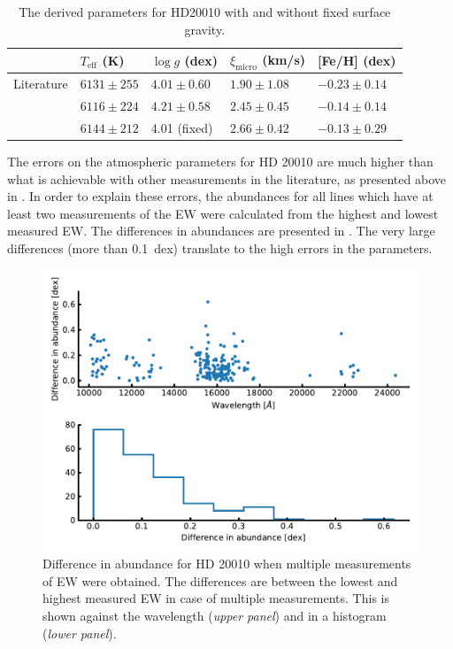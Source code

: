 \begin{table}[htb!]
    \caption{The derived parameters for HD20010 with and without fixed surface gravity.}
    \label{tab:HD20010_results}
    \centering
    \begin{tabular}{lllll}
      \hline\hline
                     & $T_\mathrm{eff}$ (K) &  $\log g$ (dex)  &   $\xi_\mathrm{micro}$ (km/s)  & [Fe/H] (dex)      \\
      \hline
        Literature   & $6131 \pm 255$       &  $4.01 \pm 0.60$ &    $1.90 \pm 1.08$              & $-0.23 \pm 0.14$ \\
      \hline
                     & $6116 \pm 224$       &  $4.21 \pm 0.58$ &    $2.45 \pm 0.45$              & $-0.14 \pm 0.14$ \\
                     & $6144 \pm 212$       &   4.01 (fixed)   &    $2.66 \pm 0.42$              & $-0.13 \pm 0.29$ \\
      \hline
    \end{tabular}
\end{table}

The errors on the atmospheric parameters for HD 20010 are much higher than what is achievable with
other measurements in the literature, as presented above in . In order to explain
these errors, the abundances for all lines which have at least two measurements of the EW were
calculated from the highest and lowest measured EW. The differences in abundances are presented in
. The very large differences (more than \SI{0.1}{dex}) translate to the
high errors in the parameters.

\begin{figure}[htpb!]
    \centering
    \includegraphics[width=0.8\linewidth]{figures/HD20010abundance_error.pdf}
    \caption{Difference in abundance for HD 20010 when multiple measurements of EW were obtained.
             The differences are between the lowest and highest measured EW in case of multiple
             measurements. This is shown against the wavelength (\emph{upper panel}) and in a
             histogram (\emph{lower panel}).}
    \label{fig:HD20010abundance}
\end{figure}

